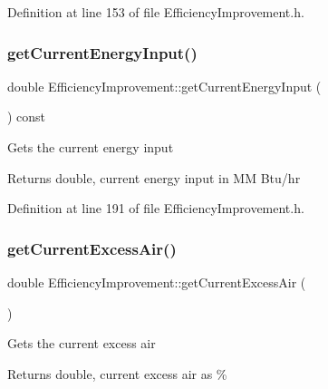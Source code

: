Definition at line 153 of file Efficiency\+Improvement.\+h.

\mbox{\label{class_efficiency_improvement_a8fcbdd3085f0a8b1120fb699522fcc05}} 
\subsubsection{\texorpdfstring{get\+Current\+Energy\+Input()}{getCurrentEnergyInput()}}
{\footnotesize\ttfamily double Efficiency\+Improvement\+::get\+Current\+Energy\+Input (\begin{DoxyParamCaption}{ }\end{DoxyParamCaption}) const\hspace{0.3cm}{\ttfamily [inline]}}

Gets the current energy input

\begin{DoxyReturn}{Returns}
double, current energy input in MM Btu/hr 
\end{DoxyReturn}


Definition at line 191 of file Efficiency\+Improvement.\+h.

\mbox{\label{class_efficiency_improvement_a42cd83e1c57f065077e31f21b3552a76}} 
\subsubsection{\texorpdfstring{get\+Current\+Excess\+Air()}{getCurrentExcessAir()}}
{\footnotesize\ttfamily double Efficiency\+Improvement\+::get\+Current\+Excess\+Air (\begin{DoxyParamCaption}{ }\end{DoxyParamCaption})}

Gets the current excess air

\begin{DoxyReturn}{Returns}
double, current excess air as \% 
\end{DoxyReturn}


